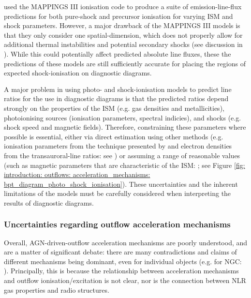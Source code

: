 \citet{Allen2008} used the MAPPINGS III ionisation code to produce a suite of emission-line-flux predictions for both pure-shock and precursor ionisation for varying ISM and shock parameters. However, a major drawback of the MAPPINGS III models is that they only consider one spatial-dimension, which does not properly allow for additional thermal instabilities and potential secondary shocks (see discussion in \citealt{Allen2008}). While this could potentially affect predicted absolute line fluxes, these the predictions of these models are still sufficiently accurate for placing the regions of expected shock-ionisation on diagnostic diagrams.  

A major problem in using photo- and shock-ionisation models to predict line ratios for the use in diagnostic diagrams is that the predicted ratios depend strongly on the properties of the ISM (e.g. gas densities and metallicities), photoionising sources (ionisation parameters, spectral indicies), and shocks (e.g. shock speed and magnetic fields). Therefore, constraining these parameters where possible is essential, either via direct estimation using other methods (e.g. ionisation parameters from the technique presented by \citealt{Baron2019a} and electron densities from the transauroral-line ratios: see \citealt{Holt2011}) or assuming a range of reasonable values (such as magnetic parameters that are characteristic of the ISM: \citealt{Allen2008}; see Figure \ref{fig: introduction: outflows: acceleration_mechanisms: bpt_diagram_photo_shock_ionisation}). These uncertainties and the inherent limitations of the models must be carefully considered when interpreting the results of diagnostic diagrams.

\subsubsection{Uncertainties regarding outflow acceleration mechanisms}
\label{section: introduction: outflows: accleration_mechanisms: conclusions}

Overall, AGN-driven-outflow acceleration mechanisms are poorly understood, and are a matter of significant debate: there are many contradictions and claims of different mechanisms being dominant, even for individual objects (e.g. for NGC: \citealt{Axon1998, Crenshaw2000_N1068, Das2005, Fischer2017, May2017,  Revalski2021, Meena2023}). Principally, this is because the relationship between acceleration mechanisms and outflow ionisation/excitation is not clear, nor is the connection between NLR gas properties and radio structures.

